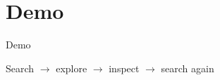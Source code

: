 \section{Demo}
\begin{frame}[c,plain]
\centering
\Huge Demo

\vspace{0.65cm}
\large
Search $\rightarrow$ explore $\rightarrow$ inspect $\rightarrow$ search again

\end{frame}
